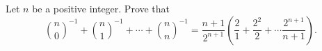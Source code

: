 Let $n$ be a positive integer. Prove that \[\binom{n}{0}^{-1}+\binom{n}{1}^{-1}+\cdots+\binom{n}{n}^{-1}=\frac{n+1}{2^{n+1}}\left(\frac{2}{1}+\frac{2^2}{2}+\cdots\frac{2^{n+1}}{n+1}\right).\]
